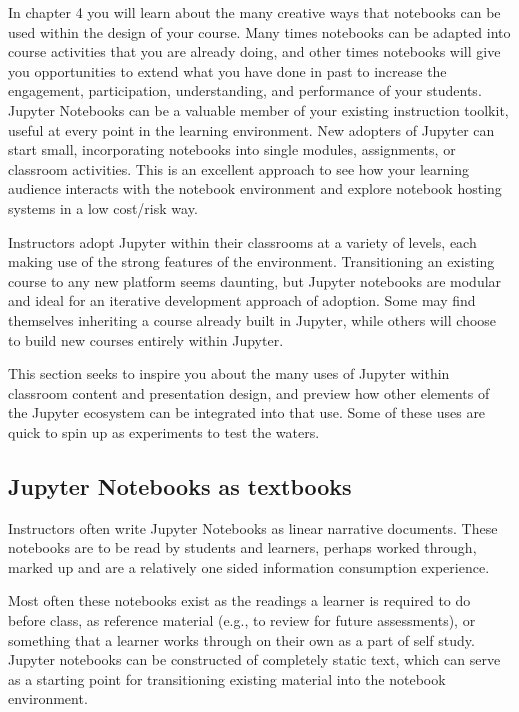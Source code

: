 \documentclass[]{book}
\begin{document}
In chapter 4 you will learn about the many creative ways that notebooks
can be used within the design of your course. Many times notebooks can
be adapted into course activities that you are already doing, and other
times notebooks will give you opportunities to extend what you have done
in past to increase the engagement, participation, understanding, and
performance of your students. Jupyter Notebooks can be a valuable member
of your existing instruction toolkit, useful at every point in the
learning environment. New adopters of Jupyter can start small,
incorporating notebooks into single modules, assignments, or classroom
activities. This is an excellent approach to see how your learning
audience interacts with the notebook environment and explore notebook
hosting systems in a low cost/risk way.

Instructors adopt Jupyter within their classrooms at a variety of
levels, each making use of the strong features of the environment.
Transitioning an existing course to any new platform seems daunting, but
Jupyter notebooks are modular and ideal for an iterative development
approach of adoption. Some may find themselves inheriting a course
already built in Jupyter, while others will choose to build new courses
entirely within Jupyter.

This section seeks to inspire you about the many uses of Jupyter within
classroom content and presentation design, and preview how other
elements of the Jupyter ecosystem can be integrated into that use. Some
of these uses are quick to spin up as experiments to test the waters.

\subsection{Jupyter Notebooks as
textbooks}\label{jupyter-notebooks-as-textbooks}

Instructors often write Jupyter Notebooks as linear narrative documents.
These notebooks are to be read by students and learners, perhaps worked
through, marked up and are a relatively one sided information
consumption experience.

Most often these notebooks exist as the readings a learner is required
to do before class, as reference material (e.g., to review for future
assessments), or something that a learner works through on their own as
a part of self study. Jupyter notebooks can be constructed of completely
static text, which can serve as a starting point for transitioning
existing material into the notebook environment.
\end{document}
